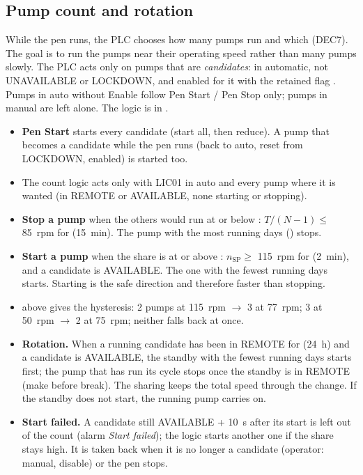 \documentclass[11pt,a4paper]{article}
\begin{document}
\subsection{Pump count and rotation}
\label{sec:count}
While the pen runs, the PLC chooses how many pumps run and which (DEC7). The goal is to run the
pumps near their operating speed rather than many pumps slowly. The PLC acts only on pumps that are
\emph{candidates}: in automatic, not UNAVAILABLE or LOCKDOWN, and enabled for it with the retained flag
. Pumps in auto without Enable follow Pen Start / Pen Stop only;
pumps in manual are left alone. The logic is in .
\begin{itemize}[nosep]
  \item \textbf{Pen Start} starts every candidate (start all, then reduce). A pump that becomes a
        candidate while the pen runs (back to auto, reset from LOCKDOWN, enabled) is started too.
  \item The count logic acts only with LIC01 in auto and every pump where it is wanted (in REMOTE or
        AVAILABLE, none starting or stopping).
  \item \textbf{Stop a pump} when the others would run at or below :
        $T/(N-1) \le$ 85~rpm for  (15~min). The pump with the most running days
        () stops.
  \item \textbf{Start a pump} when the share is at or above : $n_\text{SP} \ge$
        115~rpm for  (2~min), and a candidate is AVAILABLE. The one with the fewest
        running days starts. Starting is the safe direction and therefore faster than stopping.
  \item {} above  gives the hysteresis: 2 pumps at 115~rpm
        $\to$ 3 at 77~rpm; 3 at 50~rpm $\to$ 2 at 75~rpm; neither falls back at once.
  \item \textbf{Rotation.} When a running candidate has been in REMOTE for  (24~h)
        and a candidate is AVAILABLE, the standby with the fewest running days starts first; the
        pump that has run its cycle stops once the standby is in REMOTE (make before break). The sharing
        keeps the total speed through the change. If the standby does not start, the running pump carries on.
  \item \textbf{Start failed.} A candidate still AVAILABLE  + 10~s after its start is left
        out of the count (alarm \emph{Start failed}); the logic starts another one if the share stays
        high. It is taken back when it is no longer a candidate (operator: manual, disable) or the pen
        stops.
\end{itemize}
\end{document}
